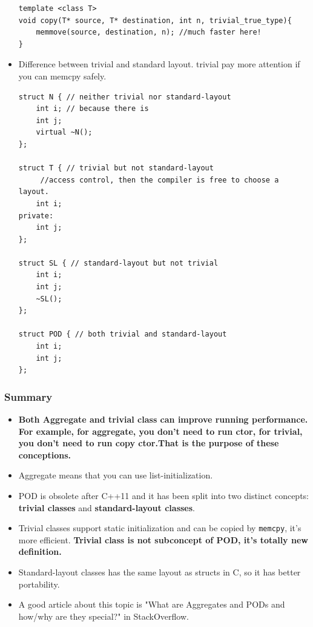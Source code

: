 \documentclass[a4paper,11pt,twoside]{book}
\begin{document}
\begin{itemize}
\begin{lstlisting}[numbers=none]
template <class T> 
void copy(T* source, T* destination, int n, trivial_true_type){
	memmove(source, destination, n); //much faster here!
}
\end{lstlisting}

\item Difference between trivial and standard layout. trivial pay more attention if you can memcpy safely.
\begin{lstlisting}[numbers=none]
struct N { // neither trivial nor standard-layout
	int i; // because there is 
	int j;
	virtual ~N();
};

struct T { // trivial but not standard-layout
	 //access control, then the compiler is free to choose a layout.
	int i;
private:
	int j;
};

struct SL { // standard-layout but not trivial
	int i;
	int j;
	~SL();
};

struct POD { // both trivial and standard-layout
	int i;
	int j;
};
\end{lstlisting}	
	
\end{itemize}


\subsubsection{Summary}
\begin{itemize}
		\item \textbf{Both Aggregate and trivial class can improve running performance. For example, for aggregate, you don't need to run ctor, for trivial, you don't need to run copy ctor.That is the purpose of these conceptions.}

	\item Aggregate means that you can use list-initialization.

	\item POD is obsolete after C++11 and it has been split into two distinct concepts: \textbf{trivial classes} and \textbf{standard-layout classes}.

	\item Trivial classes support static initialization and can be copied by \texttt{memcpy}, it's more efficient. \textbf{Trivial class is not subconcept of POD, it's totally new definition.} 

	\item Standard-layout classes has the same layout as structs in C, so it has better portability.

	\item A good article about this topic is "What are Aggregates and PODs and how/why are they special?" in StackOverflow. 
\end{itemize}
\end{document}
